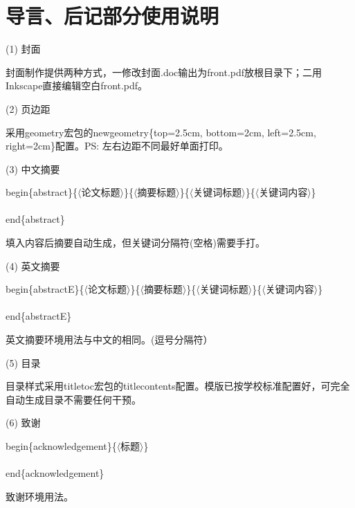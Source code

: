 \documentclass[a4paper]{article}
\begin{document}
	\section{导言、后记部分使用说明}
	\begin{body}
		(1) 封面\par
		封面制作提供两种方式，一修改{\gqq}封面.doc{\cqq}输出为front.pdf放根目录下；二用Inkscape直接编辑空白{\gqq}front.pdf{\cqq}。\par
		(2) 页边距\par
		采用geometry宏包的{\color{purple}\noindent{\bslash}newgeometry}\{top=2.5cm, bottom=2cm, left=2.5cm, right=2cm\}配置。PS: 左右边距不同最好单面打印。\par
		(3) 中文摘要\par
		{\color{purple}\noindent{\bslash}begin\{{\color{teal}abstract}\}}\{{\color{gray}$\langle$论文标题$\rangle$}\}\{{\color{gray}$\langle$摘要标题$\rangle$}\}\{{\color{gray}$\langle$关键词标题$\rangle$}\}\{{\color{gray}$\langle$关键词内容$\rangle$}\}\\
		\\
		{\color{purple}{\bslash}end\{{\color{teal}abstract}\}}\par
		填入内容后摘要自动生成，但关键词分隔符(空格)需要手打。\par
		(4) 英文摘要\par
		{\color{purple}\noindent{\bslash}begin\{{\color{teal}abstractE}\}}\{{\color{gray}$\langle$论文标题$\rangle$}\}\{{\color{gray}$\langle$摘要标题$\rangle$}\}\{{\color{gray}$\langle$关键词标题$\rangle$}\}\{{\color{gray}$\langle$关键词内容$\rangle$}\}\\
		\\
		{\color{purple}{\bslash}end\{{\color{teal}abstractE}\}}\par
		英文摘要环境用法与中文的相同。(逗号分隔符）\par
		(5) 目录\par
		目录样式采用titletoc宏包的{\color{purple}{\bslash}titlecontents}配置。模版已按学校标准配置好，可完全自动生成目录不需要任何干预。\par
		(6) 致谢\par
		{\color{purple}\noindent{\bslash}begin\{{\color{teal}acknowledgement}\}}\{{\color{gray}$\langle$标题$\rangle$}\}\\
		\\
		{\color{purple}{\bslash}end\{{\color{teal}acknowledgement}\}}\par
		致谢环境用法。\par
	\end{body}
\end{document}

